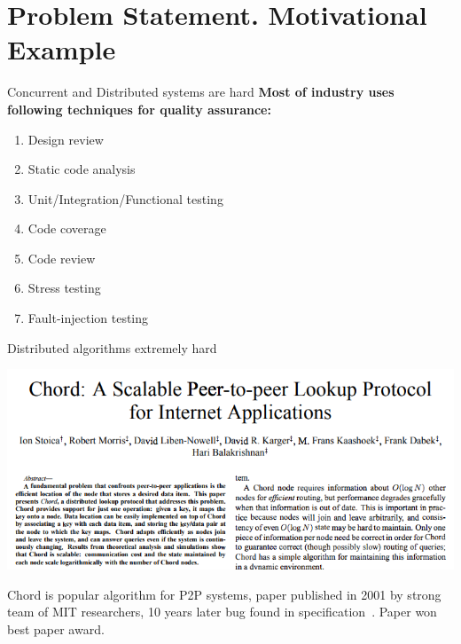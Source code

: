\documentclass[12pt]{beamer}
\begin{document}
  \section{Problem Statement. Motivational Example}
  \begin{frame}{Concurrent and Distributed systems are hard}
      \textbf{Most of industry uses following techniques for quality assurance:}
      \begin{enumerate}
          \item Design review
          \item Static code analysis
          \item Unit/Integration/Functional testing
          \item Code coverage
          \item Code review
          \item Stress testing
          \item Fault-injection testing \cite{principlesofchaos}
      \end{enumerate}
  \end{frame}
  \begin{frame}{Distributed algorithms extremely hard}
      \begin{center}
          \includegraphics[scale=0.3]{figures/chord_paper.png}
      \end{center}
      \begin{alertblock}{Chord}
          is popular algorithm for P2P systems, paper published in
          2001 by strong team of MIT researchers, 10 years later bug found
          in specification~\cite{stoica2001chord, Zave15}. Paper won best
          paper award.
      \end{alertblock}
  \end{frame}
\end{document}
